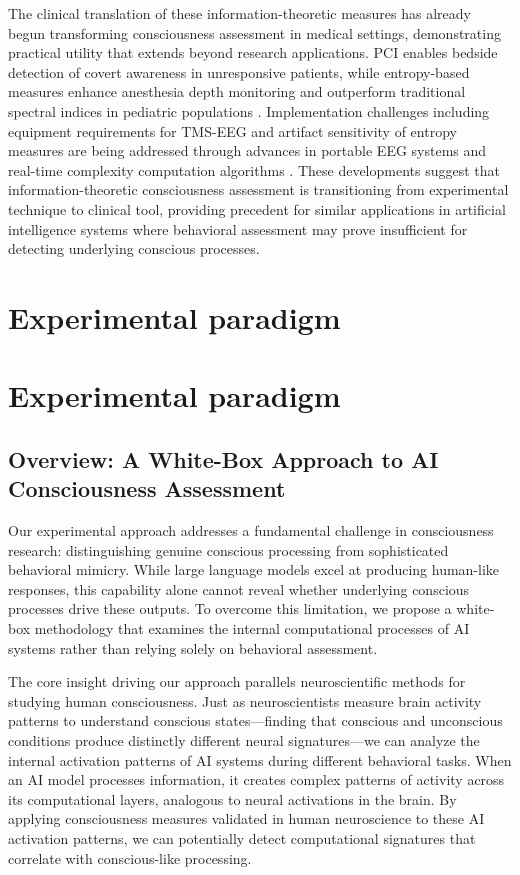 \documentclass[11pt,a4paper]{article}
\begin{document}
The clinical translation of these information-theoretic measures has already begun transforming consciousness assessment in medical settings, demonstrating practical utility that extends beyond research applications. PCI enables bedside detection of covert awareness in unresponsive patients, while entropy-based measures enhance anesthesia depth monitoring and outperform traditional spectral indices in pediatric populations \citep{Casarotto2016, Zhang2001}. Implementation challenges including equipment requirements for TMS-EEG and artifact sensitivity of entropy measures are being addressed through advances in portable EEG systems and real-time complexity computation algorithms \citep{Sarasso2021}. These developments suggest that information-theoretic consciousness assessment is transitioning from experimental technique to clinical tool, providing precedent for similar applications in artificial intelligence systems where behavioral assessment may prove insufficient for detecting underlying conscious processes.

\section{Experimental paradigm}
\label{sec:experimental_paradigm}
\section{Experimental paradigm}
\label{sec:experimental_paradigm}

\subsection{Overview: A White-Box Approach to AI Consciousness Assessment}

Our experimental approach addresses a fundamental challenge in consciousness research: distinguishing genuine conscious processing from sophisticated behavioral mimicry. While large language models excel at producing human-like responses, this capability alone cannot reveal whether underlying conscious processes drive these outputs. To overcome this limitation, we propose a white-box methodology that examines the internal computational processes of AI systems rather than relying solely on behavioral assessment.

The core insight driving our approach parallels neuroscientific methods for studying human consciousness. Just as neuroscientists measure brain activity patterns to understand conscious states—finding that conscious and unconscious conditions produce distinctly different neural signatures—we can analyze the internal activation patterns of AI systems during different behavioral tasks. When an AI model processes information, it creates complex patterns of activity across its computational layers, analogous to neural activations in the brain. By applying consciousness measures validated in human neuroscience to these AI activation patterns, we can potentially detect computational signatures that correlate with conscious-like processing.
\end{document}
